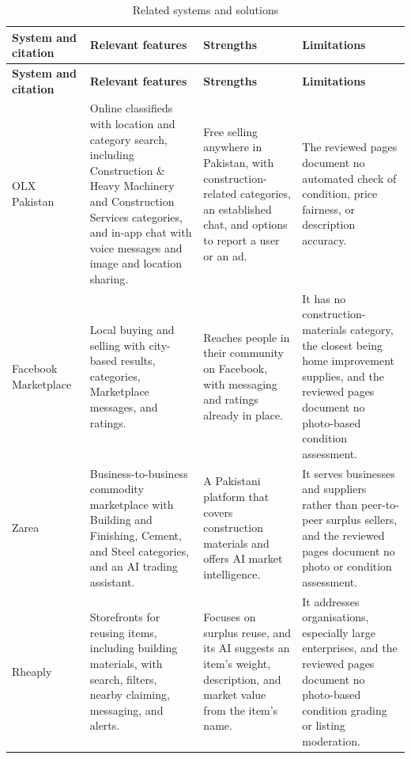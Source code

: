 {\footnotesize
\begin{longtable}{@{}p{}p{}p{}p{}@{}}
\caption{Related systems and solutions}\label{tab:related-systems}\\
\toprule
\textbf{System and citation} & \textbf{Relevant features} & \textbf{Strengths} & \textbf{Limitations} \\
\midrule
\endfirsthead
\toprule
\textbf{System and citation} & \textbf{Relevant features} & \textbf{Strengths} & \textbf{Limitations} \\
\midrule
\endhead
OLX Pakistan~\citep{olxpakistan,olxchathelp} & Online classifieds with location and category search, including Construction \& Heavy Machinery and Construction Services categories, and in-app chat with voice messages and image and location sharing. & Free selling anywhere in Pakistan, with construction-related categories, an established chat, and options to report a user or an ad. & The reviewed pages document no automated check of condition, price fairness, or description accuracy. \\
Facebook Marketplace~\citep{facebookmarketplace,facebookmarketplacehelp} & Local buying and selling with city-based results, categories, Marketplace messages, and ratings. & Reaches people in their community on Facebook, with messaging and ratings already in place. & It has no construction-materials category, the closest being home improvement supplies, and the reviewed pages document no photo-based condition assessment. \\
Zarea~\citep{zareapk,zareaabout,zareaai} & Business-to-business commodity marketplace with Building and Finishing, Cement, and Steel categories, and an AI trading assistant. & A Pakistani platform that covers construction materials and offers AI market intelligence. & It serves businesses and suppliers rather than peer-to-peer surplus sellers, and the reviewed pages document no photo or condition assessment. \\
Rheaply~\citep{rheaplyfeatures,rheaplytrust} & Storefronts for reusing items, including building materials, with search, filters, nearby claiming, messaging, and alerts. & Focuses on surplus reuse, and its AI suggests an item's weight, description, and market value from the item's name. & It addresses organisations, especially large enterprises, and the reviewed pages document no photo-based condition grading or listing moderation. \\
\bottomrule
\end{longtable}
}

